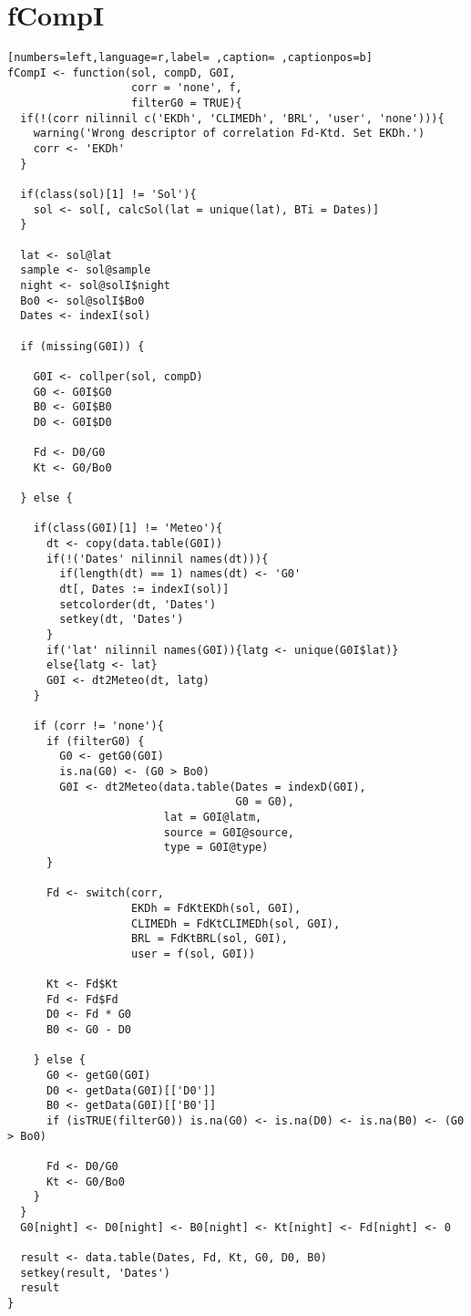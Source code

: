 \section{fCompI}
\label{sec:org787d70f}
\begin{lstlisting}[numbers=left,language=r,label= ,caption= ,captionpos=b]
fCompI <- function(sol, compD, G0I,
                   corr = 'none', f,
                   filterG0 = TRUE){
  if(!(corr nilinnil c('EKDh', 'CLIMEDh', 'BRL', 'user', 'none'))){
    warning('Wrong descriptor of correlation Fd-Ktd. Set EKDh.')
    corr <- 'EKDh'
  }

  if(class(sol)[1] != 'Sol'){
    sol <- sol[, calcSol(lat = unique(lat), BTi = Dates)]
  }

  lat <- sol@lat
  sample <- sol@sample
  night <- sol@solI$night
  Bo0 <- sol@solI$Bo0
  Dates <- indexI(sol)

  if (missing(G0I)) { 

    G0I <- collper(sol, compD)
    G0 <- G0I$G0
    B0 <- G0I$B0
    D0 <- G0I$D0

    Fd <- D0/G0
    Kt <- G0/Bo0

  } else { 

    if(class(G0I)[1] != 'Meteo'){
      dt <- copy(data.table(G0I))
      if(!('Dates' nilinnil names(dt))){
        if(length(dt) == 1) names(dt) <- 'G0'
        dt[, Dates := indexI(sol)]
        setcolorder(dt, 'Dates')
        setkey(dt, 'Dates')
      }
      if('lat' nilinnil names(G0I)){latg <- unique(G0I$lat)}
      else{latg <- lat}
      G0I <- dt2Meteo(dt, latg)
    }

    if (corr != 'none'){
      if (filterG0) {
        G0 <- getG0(G0I)
        is.na(G0) <- (G0 > Bo0)
        G0I <- dt2Meteo(data.table(Dates = indexD(G0I),
                                   G0 = G0),
                        lat = G0I@latm,
                        source = G0I@source,
                        type = G0I@type)
      }

      Fd <- switch(corr,
                   EKDh = FdKtEKDh(sol, G0I),
                   CLIMEDh = FdKtCLIMEDh(sol, G0I),
                   BRL = FdKtBRL(sol, G0I), 
                   user = f(sol, G0I))

      Kt <- Fd$Kt
      Fd <- Fd$Fd
      D0 <- Fd * G0
      B0 <- G0 - D0

    } else { 
      G0 <- getG0(G0I)
      D0 <- getData(G0I)[['D0']]
      B0 <- getData(G0I)[['B0']]
      if (isTRUE(filterG0)) is.na(G0) <- is.na(D0) <- is.na(B0) <- (G0 > Bo0)

      Fd <- D0/G0
      Kt <- G0/Bo0
    }
  }
  G0[night] <- D0[night] <- B0[night] <- Kt[night] <- Fd[night] <- 0

  result <- data.table(Dates, Fd, Kt, G0, D0, B0)
  setkey(result, 'Dates')
  result
}
\end{lstlisting}
